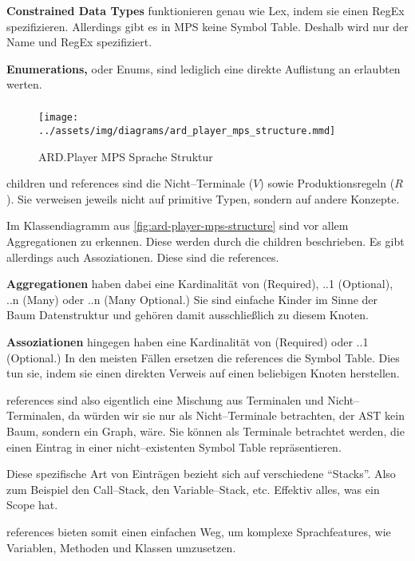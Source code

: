 \textbf{Constrained Data Types} funktionieren genau wie Lex, indem sie einen \ac{RegEx} spezifizieren.
Allerdings gibt es in \ac{MPS} keine Symbol Table.
Deshalb wird nur der Name und \ac{RegEx} spezifiziert.

\textbf{Enumerations,} oder Enums, sind lediglich eine direkte Auflistung an erlaubten werten.

\subparagraph*{}
\begin{figure}
    \texttt{[image: ../assets/img/diagrams/ard\_player\_mps\_structure.mmd]}
    \caption{\acs{ARD}.Player MPS Sprache Struktur}
    \label{fig:ard-player-mps-structure}
\end{figure}
{\ttfamily children} und {\ttfamily references} sind die Nicht--Terminale ($V$) sowie Produktionsregeln ($R$).
Sie verweisen jeweils nicht auf primitive Typen, sondern auf andere Konzepte.

Im Klassendiagramm aus \autoref{fig:ard-player-mps-structure} sind vor allem Aggregationen zu erkennen.
Diese werden durch die {\ttfamily children} beschrieben.
Es gibt allerdings auch Assoziationen.
Diese sind die {\ttfamily references}.

\textbf{Aggregationen} haben dabei eine Kardinalität von {} (Required), {..1} (Optional), {..n} (Many) oder {..n} (Many Optional.)
Sie sind einfache Kinder im Sinne der Baum Datenstruktur und gehören damit ausschließlich zu diesem Knoten.

\textbf{Assoziationen} hingegen haben eine Kardinalität von {} (Required) oder {..1} (Optional.)
In den meisten Fällen ersetzen die {\ttfamily references} die Symbol Table.
Dies tun sie, indem sie einen direkten Verweis auf einen beliebigen Knoten herstellen.

{\ttfamily references} sind also eigentlich eine Mischung aus Terminalen und Nicht--Terminalen, da würden wir sie nur als Nicht--Terminale betrachten, der \ac{AST} kein Baum, sondern ein Graph, wäre.
Sie können als Terminale betrachtet werden, die einen Eintrag in einer nicht--existenten Symbol Table repräsentieren.

Diese spezifische Art von Einträgen bezieht sich auf verschiedene \enquote{Stacks}.
Also zum Beispiel den Call--Stack, den Variable--Stack, etc.
Effektiv alles, was ein Scope hat.

{\ttfamily references} bieten somit einen einfachen Weg, um komplexe Sprachfeatures, wie Variablen, Methoden und Klassen umzusetzen.

